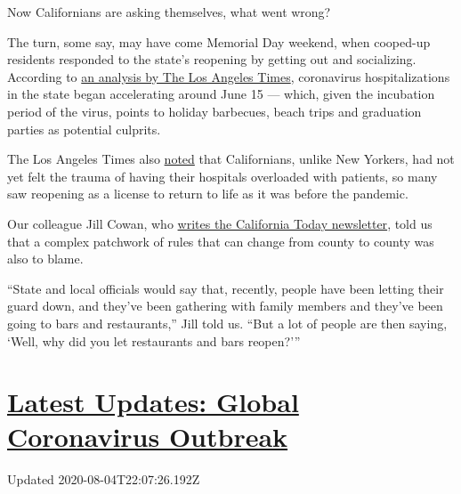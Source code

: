 Now Californians are asking themselves, what went wrong?

The turn, some say, may have come Memorial Day weekend, when cooped-up
residents responded to the state's reopening by getting out and
socializing. According to
\href{https://www.latimes.com/california/story/2020-06-29/california-coronavirus-hot-spot-memorial-day}{an
analysis by The Los Angeles Times}, coronavirus hospitalizations in the
state began accelerating around June 15 --- which, given the incubation
period of the virus, points to holiday barbecues, beach trips and
graduation parties as potential culprits.

The Los Angeles Times also
\href{https://www.latimes.com/california/story/2020-06-29/california-coronavirus-hot-spot-memorial-day}{noted}
that Californians, unlike New Yorkers, had not yet felt the trauma of
having their hospitals overloaded with patients, so many saw reopening
as a license to return to life as it was before the pandemic.

Our colleague Jill Cowan, who
\href{https://www.nytimes3xbfgragh.onion/column/california-today}{writes
the California Today newsletter}, told us that a complex patchwork of
rules that can change from county to county was also to blame.

``State and local officials would say that, recently, people have been
letting their guard down, and they've been gathering with family members
and they've been going to bars and restaurants,'' Jill told us. ``But a
lot of people are then saying, `Well, why did you let restaurants and
bars reopen?'''

\hypertarget{latest-updates-global-coronavirus-outbreak}{%
\section{\texorpdfstring{\href{https://www.nytimes3xbfgragh.onion/2020/08/04/world/coronavirus-cases.html?action=click\&pgtype=Article\&state=default\&region=MAIN_CONTENT_1\&context=storylines_live_updates}{Latest
Updates: Global Coronavirus
Outbreak}}{Latest Updates: Global Coronavirus Outbreak}}\label{latest-updates-global-coronavirus-outbreak}}

Updated 2020-08-04T22:07:26.192Z

